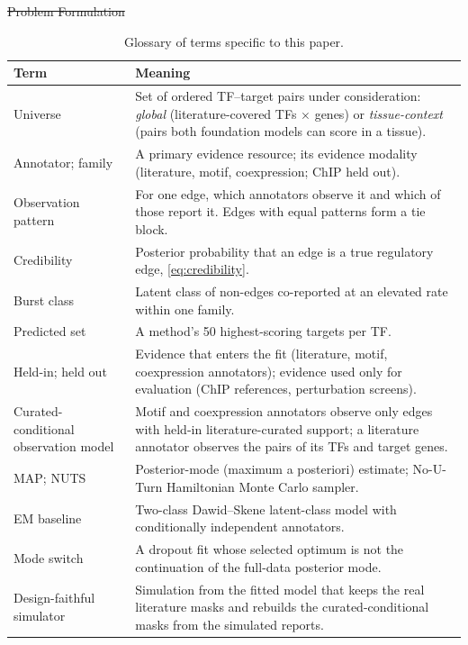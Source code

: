 \documentclass[11pt,a4paper]{article}
\providecommand{\DIFdeltex}[1]{{\protect\color{red}\sout{#1}}}                      %
\providecommand{\DIFaddbegin}{} %
\providecommand{\DIFdelbegin}{} %
\providecommand{\DIFdelend}{} %
\providecommand{\DIFdel}[1]{\texorpdfstring{\DIFdeltex{#1}}{}} %
\newcommand{\DIFscaledelfig}{0.5}
\newlength{\DIFdelgraphicswidth} %
\newlength{\DIFdelgraphicsheight} %
\newcommand{\DIFaddincludegraphics}[2][]{{\color{blue}\fbox{\DIFOincludegraphics[#1]{#2}}}} %
\newcommand{\DIFdelincludegraphics}[2][]{%
\sbox{\DIFdelgraphicsbox}{\DIFOincludegraphics[#1]{#2}}%
\settoboxwidth{\DIFdelgraphicswidth}{\DIFdelgraphicsbox} %
\settoboxtotalheight{\DIFdelgraphicsheight}{\DIFdelgraphicsbox} %
\scalebox{\DIFscaledelfig}{%
\parbox[b]{\DIFdelgraphicswidth}{\usebox{\DIFdelgraphicsbox}\\[-\baselineskip] \rule{\DIFdelgraphicswidth}{0em}}\llap{\resizebox{\DIFdelgraphicswidth}{\DIFdelgraphicsheight}{%
\setlength{\unitlength}{\DIFdelgraphicswidth}%
\begin{picture}(1,1)%
\thicklines\linethickness{2pt} %
{\color[rgb]{1,0,0}\put(0,0){\framebox(1,1){}}}%
{\color[rgb]{1,0,0}\put(0,0){\line( 1,1){1}}}%
{\color[rgb]{1,0,0}\put(0,1){\line(1,-1){1}}}%
\end{picture}%
}\hspace*{3pt}}} %
} %
\DeclareRobustCommand{\DIFaddbegin}{\DIFOaddbegin \let\includegraphics\DIFaddincludegraphics} %
\DeclareRobustCommand{\DIFdelbegin}{\DIFOdelbegin \let\includegraphics\DIFdelincludegraphics} %
\DeclareRobustCommand{\DIFdelend}{\DIFOaddend \let\includegraphics\DIFOincludegraphics} %
\begin{document}
\DIFdelbegin %
\DIFdel{Problem Formulation}%
\DIFdelend \DIFaddbegin \begin{table}[!t]
  \centering
  \caption{Glossary of terms specific to this paper.}
  \label{tab:glossary}
  \small
  \begin{tabular}{@{}p{}p{}@{}}
    \toprule
    Term & Meaning \\
    \midrule
    Universe & Set of ordered TF--target pairs under consideration: \emph{global} (literature-covered TFs $\times$ genes) or \emph{tissue-context} (pairs both foundation models can score in a tissue). \\
    Annotator; family & A primary evidence resource; its evidence modality (literature, motif, coexpression; ChIP held out). \\
    Observation pattern & For one edge, which annotators observe it and which of those report it. Edges with equal patterns form a tie block. \\
    Credibility & Posterior probability that an edge is a true regulatory edge, \cref{eq:credibility}. \\
    Burst class & Latent class of non-edges co-reported at an elevated rate within one family. \\
    Predicted set & A method's 50 highest-scoring targets per TF. \\
    Held-in; held out & Evidence that enters the fit (literature, motif, coexpression annotators); evidence used only for evaluation (ChIP references, perturbation screens). \\
    Curated-conditional observation model & Motif and coexpression annotators observe only edges with held-in literature-curated support; a literature annotator observes the pairs of its TFs and target genes. \\
    MAP; NUTS & Posterior-mode (maximum a posteriori) estimate; No-U-Turn Hamiltonian Monte Carlo sampler. \\
    EM baseline & Two-class Dawid--Skene latent-class model with conditionally independent annotators. \\
    Mode switch & A dropout fit whose selected optimum is not the continuation of the full-data posterior mode. \\
    Design-faithful simulator & Simulation from the fitted model that keeps the real literature masks and rebuilds the curated-conditional masks from the simulated reports. \\

\end{tabular}
\end{table}
\end{document}
